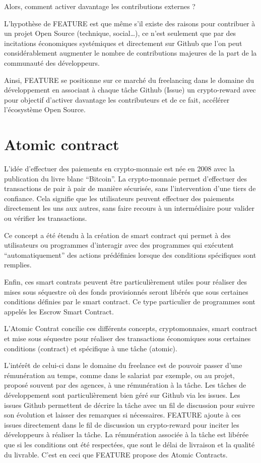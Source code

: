 \documentclass[
	a4paper, %
	10pt, %
	unnumberedsections, %
	twoside, %
]{LTJournalArticle}
\begin{document}
Alors, comment activer davantage les contributions externes ?

L’hypothèse de FEATURE est que même s'il existe des raisons pour contribuer à un projet Open Source (technique, social…), ce n’est seulement que par des incitations économiques systémiques et directement sur Github que l’on peut considérablement augmenter le nombre de contributions majeures de la part de la communauté des développeurs.

Ainsi, FEATURE se positionne sur ce marché du freelancing dans le domaine du développement en associant à chaque tâche Github (Issue) un crypto-reward avec pour objectif d’activer davantage les contributeurs et de ce fait, accélérer l’écosystème Open Source.


\section{Atomic contract}

L'idée d'effectuer des paiements en crypto-monnaie est née en 2008 avec la publication du livre blanc “Bitcoin”. La crypto-monnaie permet d'effectuer des transactions de pair à pair de manière sécurisée, sans l'intervention d'une tiers de confiance. Cela signifie que les utilisateurs peuvent effectuer des paiements directement les uns aux autres, sans faire recours à un intermédiaire pour valider ou vérifier les transactions.

Ce concept a été étendu à la création de smart contract qui permet à des utilisateurs ou programmes d'interagir avec des programmes qui exécutent “automatiquement” des actions prédéfinies lorsque des conditions spécifiques sont remplies.

Enfin, ces smart contrats peuvent être particulièrement utiles pour réaliser des mises sous séquestre où des fonds provisionnés seront libérés que sous certaines conditions définies par le smart contract. Ce type particulier de programmes sont appelés les Escrow Smart Contract.
 
L’Atomic Contrat concilie ces différents concepts, cryptomonnaies, smart contract et mise sous séquestre pour réaliser des transactions économiques sous certaines conditions (contract) et spécifique à une tâche (atomic).

L'intérêt de celui-ci dans le domaine du freelance est de pouvoir passer d’une rémunération au temps, comme dans le salariat par exemple, ou au projet, proposé souvent par des agences, à une rémunération à la tâche. Les tâches de développement sont particulièrement bien géré sur Github via les issues. Les issues Github permettent de décrire la tâche avec un fil de discussion pour suivre son évolution et laisser des remarques si nécessaires. FEATURE ajoute à ces issues directement dans le fil de discussion un crypto-reward pour inciter les développeurs à réaliser la tâche. La rémunération associée à la tâche est libérée que si les conditions ont été respectées, que sont le délai de livraison et la qualité du livrable. C’est en ceci que FEATURE propose des Atomic Contracts.
\end{document}

